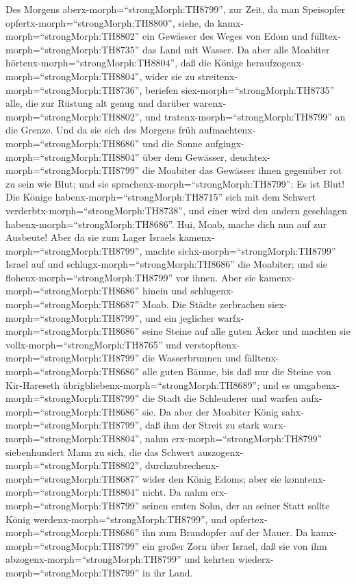  Des Morgens aberx-morph=``strongMorph:TH8799'', zur Zeit,
da man Speisopfer opfertx-morph=``strongMorph:TH8800'', siehe, da
kamx-morph=``strongMorph:TH8802'' ein Gewässer des Weges von Edom und
fülltex-morph=``strongMorph:TH8735'' das Land mit Wasser. 
Da aber alle Moabiter hörtenx-morph=``strongMorph:TH8804'', daß die
Könige heraufzogenx-morph=``strongMorph:TH8804'', wider sie zu
streitenx-morph=``strongMorph:TH8736'', beriefen
siex-morph=``strongMorph:TH8735'' alle, die zur Rüstung alt genug und
darüber warenx-morph=``strongMorph:TH8802'', und
tratenx-morph=``strongMorph:TH8799'' an die Grenze.  Und da
sie sich des Morgens früh aufmachtenx-morph=``strongMorph:TH8686'' und
die Sonne aufgingx-morph=``strongMorph:TH8804'' über dem Gewässer,
deuchtex-morph=``strongMorph:TH8799'' die Moabiter das Gewässer ihnen
gegenüber rot zu sein wie Blut;  und sie
sprachenx-morph=``strongMorph:TH8799'': Es ist Blut! Die Könige
habenx-morph=``strongMorph:TH8715'' sich mit dem Schwert
verderbtx-morph=``strongMorph:TH8738'', und einer wird den andern
geschlagen habenx-morph=``strongMorph:TH8686''. Hui, Moab, mache dich
nun auf zur Ausbeute!  Aber da sie zum Lager Israels
kamenx-morph=``strongMorph:TH8799'', machte
sichx-morph=``strongMorph:TH8799'' Israel auf und
schlugx-morph=``strongMorph:TH8686'' die Moabiter; und sie
flohenx-morph=``strongMorph:TH8799'' vor ihnen. Aber sie
kamenx-morph=``strongMorph:TH8686'' hinein und
schlugenx-morph=``strongMorph:TH8687'' Moab.  Die Städte
zerbrachen siex-morph=``strongMorph:TH8799'', und ein jeglicher
warfx-morph=``strongMorph:TH8686'' seine Steine auf alle guten Äcker und
machten sie vollx-morph=``strongMorph:TH8765'' und
verstopftenx-morph=``strongMorph:TH8799'' die Wasserbrunnen und
fälltenx-morph=``strongMorph:TH8686'' alle guten Bäume, bis daß nur die
Steine von Kir-Hareseth übrigbliebenx-morph=``strongMorph:TH8689''; und
es umgabenx-morph=``strongMorph:TH8799'' die Stadt die Schleuderer und
warfen aufx-morph=``strongMorph:TH8686'' sie.  Da aber der
Moabiter König sahx-morph=``strongMorph:TH8799'', daß ihm der Streit zu
stark warx-morph=``strongMorph:TH8804'', nahm
erx-morph=``strongMorph:TH8799'' siebenhundert Mann zu sich, die das
Schwert auszogenx-morph=``strongMorph:TH8802'',
durchzubrechenx-morph=``strongMorph:TH8687'' wider den König Edoms; aber
sie konntenx-morph=``strongMorph:TH8804'' nicht.  Da nahm
erx-morph=``strongMorph:TH8799'' seinen ersten Sohn, der an seiner Statt
sollte König werdenx-morph=``strongMorph:TH8799'', und
opfertex-morph=``strongMorph:TH8686'' ihn zum Brandopfer auf der Mauer.
Da kamx-morph=``strongMorph:TH8799'' ein großer Zorn über Israel, daß
sie von ihm abzogenx-morph=``strongMorph:TH8799'' und kehrten
wiederx-morph=``strongMorph:TH8799'' in ihr Land.

